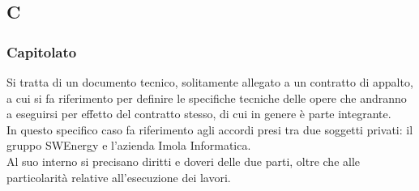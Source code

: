 \subsection{C}
\subsubsection{Capitolato}
Si tratta di un documento tecnico, solitamente allegato a un contratto di appalto, a cui si fa riferimento per definire le specifiche tecniche delle opere che andranno a eseguirsi per effetto del contratto stesso, di cui in genere è parte integrante. \\
In questo specifico caso fa riferimento agli accordi presi tra due soggetti privati: il gruppo SWEnergy e l'azienda Imola Informatica. \\
Al suo interno si precisano diritti e doveri delle due parti, oltre che alle particolarità relative all'esecuzione dei lavori.

